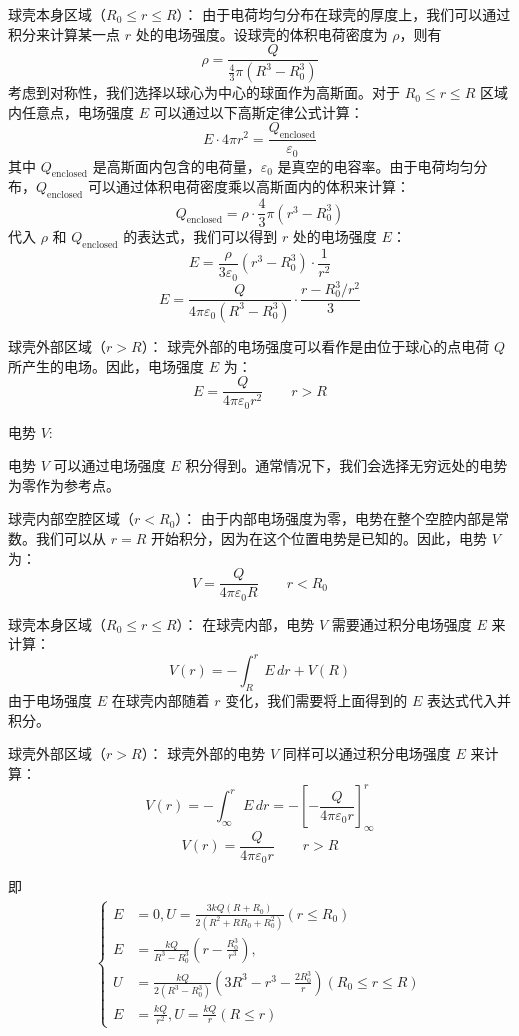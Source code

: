 \documentclass[UTF8]{article}
\numberwithin{figure}{subsection}
\numberwithin{table}{subsection}
\begin{document}
\begin{multicols}{2}
	球壳本身区域（$R_0 \leq r \leq R$）：
	由于电荷均匀分布在球壳的厚度上，我们可以通过积分来计算某一点 $r$ 处的电场强度。设球壳的体积电荷密度为 $\rho$，则有 
	\[ \rho = \frac{Q}{\frac{4}{3}\pi (R^3 - R_0^3)} \]
	考虑到对称性，我们选择以球心为中心的球面作为高斯面。对于 $R_0 \leq r \leq R$ 区域内任意点，电场强度 $E$ 可以通过以下高斯定律公式计算：
	\[ E \cdot 4\pi r^2 = \frac{Q_{\text{enclosed}}}{\varepsilon_0} \]
	其中 $Q_{\text{enclosed}}$ 是高斯面内包含的电荷量，$\varepsilon_0$ 是真空的电容率。由于电荷均匀分布，$Q_{\text{enclosed}}$ 可以通过体积电荷密度乘以高斯面内的体积来计算：
	\[ Q_{\text{enclosed}} = \rho \cdot \frac{4}{3}\pi (r^3 - R_0^3) \]
	代入 $\rho$ 和 $Q_{\text{enclosed}}$ 的表达式，我们可以得到 $r$ 处的电场强度 $E$：
	\[ E = \frac{\rho}{3\varepsilon_0}(r^3 - R_0^3) \cdot \frac{1}{r^2} \]
	\[ E = \frac{Q}{4\pi\varepsilon_0(R^3 - R_0^3)} \cdot \frac{r - R_0^3/r^2}{3} \]
	
	球壳外部区域（$r > R$）：
	球壳外部的电场强度可以看作是由位于球心的点电荷 $Q$ 所产生的电场。因此，电场强度 $E$ 为：
	\[ E = \frac{Q}{4\pi\varepsilon_0 r^2} \quad  \quad r > R \]
	
	电势 $V$:
	
	电势 $V$ 可以通过电场强度 $E$ 积分得到。通常情况下，我们会选择无穷远处的电势为零作为参考点。
	
	球壳内部空腔区域（$r < R_0$）：
	由于内部电场强度为零，电势在整个空腔内部是常数。我们可以从 $r = R$ 开始积分，因为在这个位置电势是已知的。因此，电势 $V$ 为：
	\[ V = \frac{Q}{4\pi\varepsilon_0 R} \quad  \quad r < R_0 \]
	
	球壳本身区域（$R_0 \leq r \leq R$）：
	在球壳内部，电势 $V$ 需要通过积分电场强度 $E$ 来计算：
	\[ V(r) = -\int_{R}^{r} E \, dr + V(R) \]
	由于电场强度 $E$ 在球壳内部随着 $r$ 变化，我们需要将上面得到的 $E$ 表达式代入并积分。
	
	球壳外部区域（$r > R$）：
	球壳外部的电势 $V$ 同样可以通过积分电场强度 $E$ 来计算：
	\[ V(r) = -\int_{\infty}^{r} E \, dr = -\left[-\frac{Q}{4\pi\varepsilon_0 r}\right]_{\infty}^{r} \]
	\[ V(r) = \frac{Q}{4\pi\varepsilon_0 r} \quad  \quad r > R \]
	\par 即
	\begin{align}
		\left\{
		\begin{aligned}
			E&=0,U=\frac{3kQ(R+R_0)}{2(R^2+RR_0+R_0^2)}  (r\leq R_0) \\
			E&=\frac{kQ}{R^3-R_0^3} (r-\frac{R_0^3}{r^3}),\\
			U&=\frac{kQ}{2(R^3-R_0^3)} (3R^3-r^3-\frac{2R_0^3}{r}) (R_0\leq r\leq R)\\
			E&=\frac{kQ}{r^2},U=\frac{kQ}{r} (R\leq r)
		\end{aligned}   
		\right.
	\end{align}

\end{multicols}
\end{document}
